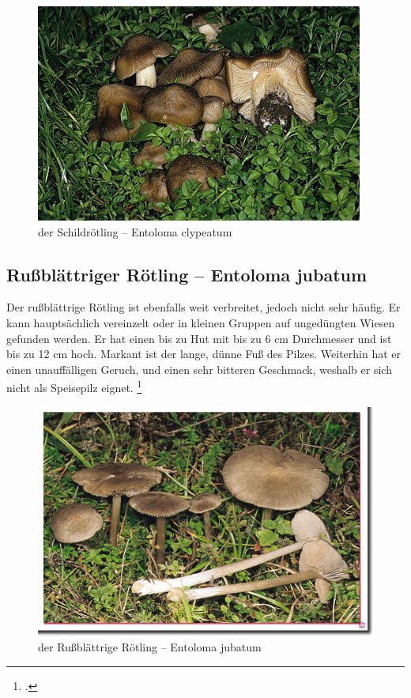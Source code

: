 \documentclass[a4paper,abstracton]{scrreprt}
\begin{document}
\begin{figure}[H]
\centering
\includegraphics[scale=22]{schildroetling}
\caption{der Schildrötling -- Entoloma clypeatum }
\label{fig:schildroetling}
\end{figure}

\subsection{Rußblättriger Rötling -- Entoloma jubatum}
Der rußblättrige Rötling ist ebenfalls weit verbreitet, jedoch nicht sehr häufig. Er kann hauptsächlich vereinzelt oder in kleinen Gruppen auf ungedüngten Wiesen gefunden werden. Er hat einen bis zu Hut mit bis zu 6 cm Durchmesser und ist bis zu 12 cm hoch. Markant ist der lange, dünne Fuß des Pilzes. Weiterhin hat er einen unauffälligen Geruch, und einen sehr bitteren Geschmack, weshalb er sich nicht als Speisepilz eignet.
\footcite{russblaettrig}
\begin{figure}[H]
\centering
\includegraphics[scale=0.3]{russblaettrig}
\caption{der Rußblättrige Rötling -- Entoloma jubatum }
\label{fig:russblaettrig}
\end{figure}
\end{document}
